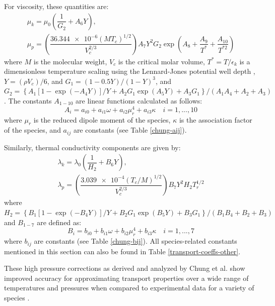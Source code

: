 For viscosity, these quantities are:
\begin{equation}
\begin{split}
\mu_k = \mu_0 \left( \dfrac{1}{G_2} + A_6 Y \right), \\ 
\mu_p = \left(\dfrac{\num{36.344e-6}(MT_c)^{1/2}}{V_c^{2/3}}\right)A_7Y^2G_2\exp(A_8 + \dfrac{A_9}{T^*} + \dfrac{A_{10}}{T^{*2}}) 
\end{split}
\end{equation}
where $M$ is the molecular weight, $V_c$ is the critical molar volume, $T^* = T/\epsilon_k$ is a dimensionless temperature scaling using the Lennard-Jones potential well depth \cite{}, $Y = (\rho V_c)/6$, and $G_1 = (1-0.5Y)/(1-Y)^3$, and $G_2 = \left\{A_1\left[   1-\exp(-A_4Y)\right]/Y + A_2G_1\exp(A_5Y) + A_3G_1 \right\}/(A_1A_4 + A_2 + A_3)$. The constants $A_{1-10}$ are linear functions calculated as follows: 
\begin{equation}
A_i = a_{i0} + a_{i1} \omega + a_{i2} \mu_r^4 + a_{i3} \kappa \quad i = 1,..., 10
\end{equation} 
where $\mu_r$ is the reduced dipole moment of the species, $\kappa$ is the association factor of the species, and $a_{ij}$ are constants (see Table \ref{chung-aij}).  

Similarly, thermal conductivity components are given by: 
\begin{equation}
\begin{split}
\lambda_k = \lambda_0 \left( \dfrac{1}{H_2} + B_6 Y \right), \\ 
\lambda_p = \left(\dfrac{\num{3.039e-4}(T_c/M)^{1/2}}{V_c^{2/3}}\right)B_7Y^2H_2T_r^{1/2} 
\end{split}
\end{equation}
where $H_2 = \left\{B_1\left[   1-\exp(-B_4Y)\right]/Y + B_2G_1\exp(B_5Y) + B_3G_1 \right\}/(B_1B_4 + B_2 + B_3)$ and $B_{1-7}$ are defined as: 
\begin{equation}
B_i = b_{i0} + b_{i1} \omega + b_{i2} \mu_r^4 + b_{i3} \kappa \quad i = 1,..., 7
\end{equation}
where $b_{ij}$ are constants (see Table \ref{chung-bij}). All species-related constants mentioned in this section can also be found in Table \ref{transport-coeffs-other}. 

These high pressure corrections as derived and analyzed by Chung et al. show improved accuracy for approximating transport properties over a wide range of temperatures and pressures when compared to experimental data for a variety of species \cite{chung:1988}. 

